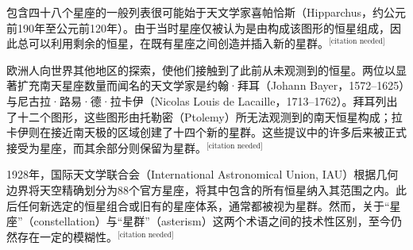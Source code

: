 包含四十八个星座的一般列表很可能始于天文学家喜帕恰斯（Hipparchus，约公元前190年至公元前120年）。由于当时星座仅被认为是由构成该图形的恒星组成，因此总可以利用剩余的恒星，在既有星座之间创造并插入新的星群。\(^\text{[citation needed]}\)

欧洲人向世界其他地区的探索，使他们接触到了此前从未观测到的恒星。两位以显著扩充南天星座数量而闻名的天文学家是约翰·拜耳（Johann Bayer，1572–1625）与尼古拉·路易·德·拉卡伊（Nicolas Louis de Lacaille，1713–1762）。拜耳列出了十二个图形，这些图形由托勒密（Ptolemy）所无法观测到的南天恒星构成；拉卡伊则在接近南天极的区域创建了十四个新的星群。这些提议中的许多后来被正式接受为星座，而其余部分则保留为星群。\(^\text{[citation needed]}\)

1928年，国际天文学联合会（International Astronomical Union, IAU）根据几何边界将天空精确划分为88个官方星座，将其中包含的所有恒星纳入其范围之内。此后任何新选定的恒星组合或旧有的星座体系，通常都被视为星群。然而，关于“星座”（constellation）与“星群”（asterism）这两个术语之间的技术性区别，至今仍然存在一定的模糊性。\(^\text{[citation needed]}\)
